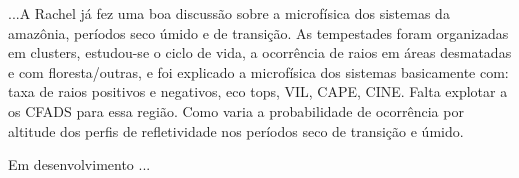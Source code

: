 





...A Rachel já fez uma boa discussão sobre a microfísica dos sistemas da amazônia, períodos seco úmido e de transição. As tempestades foram organizadas em clusters, estudou-se o ciclo de vida, a ocorrência de raios em áreas desmatadas e com floresta/outras, e foi explicado a microfísica dos sistemas basicamente com: taxa de raios positivos e negativos, eco tops, VIL, CAPE, CINE. Falta explotar a os CFADS para essa região. Como varia a probabilidade de ocorrência por altitude dos perfis de refletividade nos períodos seco de transição e úmido.



Em desenvolvimento ...



